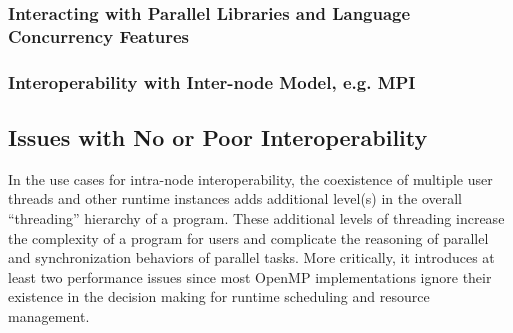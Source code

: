 %

\subsubsection{Interacting with Parallel Libraries and Language Concurrency Features}



\subsubsection{Interoperability with Inter-node Model, e.g. MPI}




\subsection{Issues with No or Poor Interoperability}
In the use cases for intra-node interoperability, 
the coexistence of multiple user threads and other runtime instances
adds additional level(s) in the overall ``threading''
hierarchy of a program. %
These additional levels of threading increase the complexity of a program for 
users and complicate the reasoning of parallel and synchronization behaviors of parallel tasks. 
More critically, it introduces at least two performance issues
since most OpenMP implementations ignore their existence %
in the decision making for runtime scheduling and resource management. 

